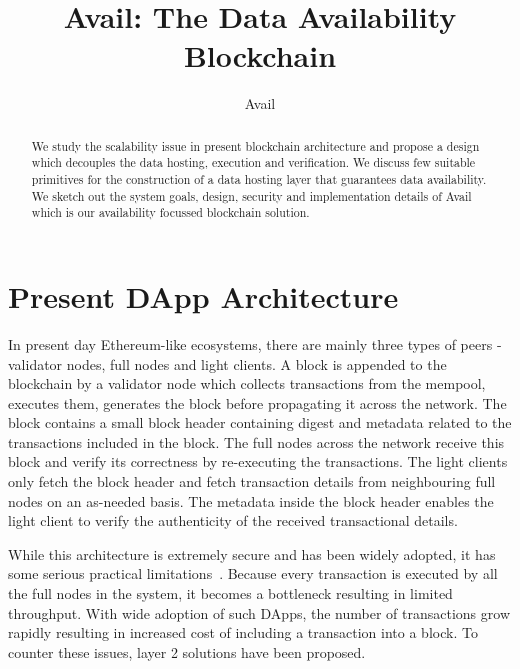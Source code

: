 \documentclass[sigconf, screen=true, nonacm]{acmart}
\begin{document}
\title{Avail: The Data Availability Blockchain}
\author{Avail \vspace{1cm}}

\begin{abstract}
    We study the scalability issue in present blockchain architecture and propose a design which decouples the data hosting, execution and verification. We discuss few suitable primitives for the construction of a data hosting layer that guarantees data availability. We sketch out the system goals, design, security and implementation details of Avail which is our availability focussed blockchain solution. 
\end{abstract}

\maketitle


\section{Present DApp Architecture}
    In present day Ethereum-like ecosystems, there are mainly three types of peers - validator nodes, full nodes and light clients. A block is appended to the blockchain by a validator node which collects transactions from the mempool, executes them, generates the block before propagating it across the network. The block contains a small block header containing digest and metadata related to the transactions included in the block. The full nodes across the network receive this block and verify its correctness by re-executing the transactions. The light clients only fetch the block header and fetch transaction details from neighbouring full nodes on an as-needed basis. The metadata inside the block header enables the light client to verify the authenticity of the received transactional details. 

    While this architecture is extremely secure and has been widely adopted, it has some serious practical limitations~\cite{Stanford:2020}. Because every transaction is executed by all the full nodes in the system, it becomes a bottleneck resulting in limited throughput. With wide adoption of such DApps, the number of transactions grow rapidly resulting in increased cost of including a transaction into a block. To counter these issues, layer 2 solutions have been proposed. 
\end{document}
